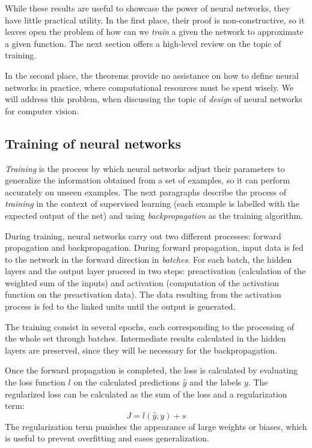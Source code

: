 While these results are useful to showcase the power of neural networks, they have little practical utility. In the first place, their proof is non-constructive, so it leaves open the problem of how can we \textit{train} a given the network to  approximate a given function. The next section offers a high-level review on the topic of training.

In the second place, the theorems provide no assistance on how to define neural networks in practice, where computational resources must be spent wisely. We will address this problem, when discussing the topic of \textit{design} of neural networks for computer vision. 

\subsection{Training of neural networks}
\textit{Training} is the process by which neural networks adjust their parameters to generalize the information obtained from a set of examples, so it can perform accurately on unseen examples. The next paragraphs describe the process of \textit{training} in the context of supervised learning (each example is labelled with the expected output of the net) and using \textit{backpropagation} as the training algorithm. 

During training, neural networks carry out two different processes: forward propagation and backpropagation. During forward propagation, input data is fed to the network in the forward direction in \textit{batches}. For each batch, the hidden layers and the output layer proceed in two steps: preactivation (calculation of the weighted sum of the inputs) and activation (computation of the activation function on the preactivation data). The data resulting from the activation process is fed to the linked units until the output is generated.

The training consist in several epochs, each corresponding to the processing of the whole set through batches. Intermediate results calculated in the hidden layers are preserved, since they will be necessary for the backpropagation.

Once the forward propagation is completed, the loss is calculated by evaluating the loss function \( l \) on the calculated predictions \( \hat{y} \) and the labels \( y \). The regularized loss can be calculated as the sum of the loss and a regularization term:
\[ J = l(\hat{y}, y) + s\]
The regularization term punishes the appearance of large weights or biases, which is useful to prevent overfitting and eases generalization.

